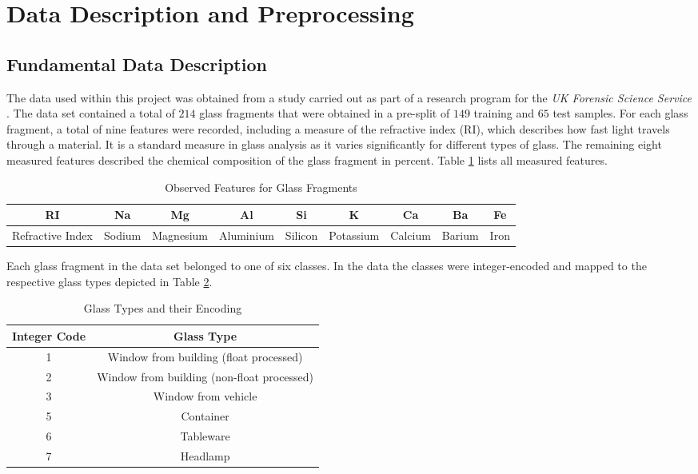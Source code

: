 \section{Data Description and Preprocessing}
\subsection{Fundamental Data Description}

The data used within this project was obtained from a study carried out as part of a research program for the \textit{UK Forensic Science Service} \cite{ForensicScienceInduction}. The data set contained a total of $214$ glass fragments that were obtained in a pre-split of $149$ training and $65$ test samples. For each glass fragment, a total of nine features were recorded, including a measure of the refractive index (RI), which describes how fast light travels through a material. It is a standard measure in glass analysis as it varies significantly for different types of glass. The remaining eight measured features described the chemical composition of the glass fragment in percent. Table \ref{features} lists all measured features.
\newline

\begin{table}[!ht]
  \footnotesize
  \centering
\begin{tabular}{ c c c c c c c c c }
 \toprule
 \textbf{RI} & \textbf{Na} & \textbf{Mg} & \textbf{Al} & \textbf{Si} & \textbf{K} & \textbf{Ca} & \textbf{Ba} & \textbf{Fe} \\ 
 \midrule 
 Refractive Index & Sodium & Magnesium & Aluminium & Silicon & Potassium & Calcium & Barium & Iron \\ 
 \bottomrule
\end{tabular}
\captionsetup{justification=centering,margin=2cm}
\caption{Observed Features for Glass Fragments}
\label{features}
\end{table}

Each glass fragment in the data set belonged to one of six classes. In the data the classes were integer-encoded and mapped to the respective glass types depicted in Table \ref{classes}.
\newline

\begin{table}[!ht]
  \footnotesize
  \centering
\begin{tabular}{ c c }
 \toprule
 Integer Code & Glass Type \\
 \midrule 
 1 & Window from building (float processed) \\
 2 & Window from building (non-float processed) \\ 
 3 & Window from vehicle \\
 5 & Container \\
 6 & Tableware \\
 7 & Headlamp \\
 \bottomrule
\end{tabular}
\captionsetup{justification=centering,margin=2cm}
\caption{Glass Types and their Encoding}
\label{classes}
\end{table}


